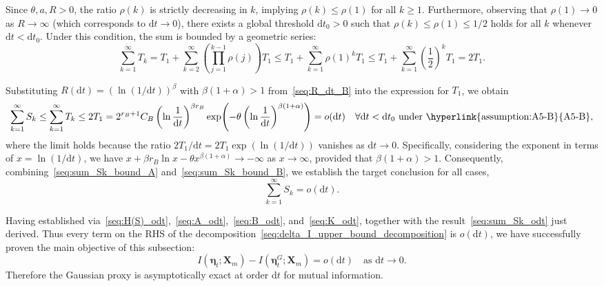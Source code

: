 \documentclass[
 longbibliography,
 twocolumn,
 superscriptaddress,
 amsmath,
 amssymb,
 amsthm,
 amsfonts,
 prl,
 floatfix,
]{revtex4-2}
\begin{document}
\begin{widetext}
Since $\theta, a, R > 0$, the ratio $\rho(k)$ is strictly decreasing in $k$, implying $\rho(k)\leq\rho(1)$ for all $k\ge 1$. Furthermore, observing that $\rho(1)\rightarrow0$ as $R\rightarrow\infty$ (which corresponds to $\mathrm dt\rightarrow0$), there exists a global threshold $\mathrm dt_0>0$ such that $\rho(k)\leq\rho(1)\leq1/2$ holds for all $k$ whenever $\mathrm dt<\mathrm dt_0$. Under this condition, the sum is bounded by a geometric series:
\begin{equation*}
    \sum_{k=1}^\infty T_k
    =T_1+\sum_{k=2}^\infty\left(\prod_{j=1}^{k-1} \rho(j)\right)T_1
    \leq T_1+\sum_{k=1}^\infty\rho(1)^kT_1
    \leq T_1+\sum_{k=1}^\infty\left(\frac{1}{2}\right)^k T_1
    =2T_1.
\end{equation*}

Substituting $R(\mathrm dt)=(\ln(1/\mathrm dt))^\beta$ with $\beta(1+\alpha)>1$ from~\eqref{seq:R_dt_B} into the expression for $T_1$, we obtain
\begin{equation}
    \sum_{k=1}^\infty S_k
    \leq\sum_{k=1}^\infty T_k\leq2T_1
    =2^{r_B+1}C_B\left(\ln\frac{1}{\mathrm dt}\right)^{\beta r_B}
    \exp\!\left(-\theta\left(\ln\frac{1}{\mathrm dt}\right)^{\beta(1+\alpha)}\right)
    =o(\mathrm dt)
    \quad\forall\mathrm dt<\mathrm dt_0
    \text{ under~\hyperlink{assumption:A5-B}{A5-B}},
    \label{seq:sum_Sk_bound_B}
\end{equation}
where the limit holds because the ratio $2T_1/\mathrm dt = 2T_1 \exp(\ln(1/\mathrm dt))$ vanishes as $\mathrm dt\rightarrow0$. Specifically, considering the exponent in terms of $x=\ln(1/\mathrm dt)$, we have $x+\beta r_B\ln x-\theta x^{\beta(1+\alpha)}\rightarrow-\infty$ as $x\rightarrow\infty$, provided that $\beta(1+\alpha)>1$.
Consequently, combining~\eqref{seq:sum_Sk_bound_A} and~\eqref{seq:sum_Sk_bound_B}, we establish the target conclusion for all cases,
\begin{equation}
    \sum_{k=1}^\infty S_k=o(\mathrm dt).
    \label{seq:sum_Sk_odt}
\end{equation}

Having established via~\eqref{seq:H(S)_odt},~\eqref{seq:A_odt},~\eqref{seq:B_odt}, and~\eqref{seq:K_odt}, together with the result~\eqref{seq:sum_Sk_odt} just derived. Thus every term on the RHS of the decomposition~\eqref{seq:delta_I_upper_bound_decomposition} is $o(\mathrm dt)$, we have successfully proven the main objective of this subsection:
\begin{equation}
    I(\bm\eta_t;\bm X_m)-I(\bm\eta_t^G;\bm X_m)=o(\mathrm dt)
    \quad\text{as }\mathrm dt\rightarrow0.
    \label{seq:deltaI_odt}
\end{equation}
Therefore the Gaussian proxy is asymptotically exact at order $\mathrm dt$ for mutual information.


\end{widetext}
\end{document}
